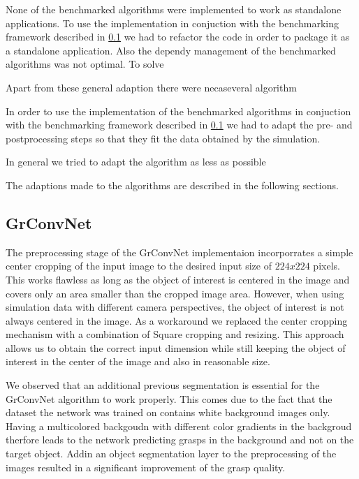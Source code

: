 None of the benchmarked algorithms were implemented to work as standalone applications.
To use the implementation in conjuction with the benchmarking framework described in \ref{} we had to refactor the code in order to package it as a standalone application.
Also the dependy management of the benchmarked algorithms was not optimal.
To solve

Apart from these general adaption there were necaseveral algorithm

In order to use the implementation of the benchmarked algorithms in conjuction with the benchmarking framework described in \ref{} we had to adapt
the pre- and postprocessing steps so that they fit the data obtained by the simulation.

In general we tried to adapt the algorithm as less as possible

The adaptions made to the algorithms are described in the following sections.


\subsection{GrConvNet}
The preprocessing stage of the GrConvNet implementaion incorporrates a simple center cropping of the input image to the desired input size of $224x224$ pixels.
This works flawless as long as the object of interest is centered in the image and covers only an area smaller than the cropped image area.
However, when using simulation data with different camera perspectives, the object of interest is not always centered in the image.
As a workaround we replaced the center cropping mechanism with a combination of Square cropping and resizing.
This approach allows us to obtain the correct input dimension while still keeping the object of interest in the center of the image and also in reasonable size.

We observed that an additional previous segmentation is essential for the GrConvNet algorithm to work properly.
This comes due to the fact that the dataset the network was trained on contains white background images only.
Having a multicolored backgoudn with different color gradients in the backgroud therfore leads to the network predicting grasps in the background and not on the target object.
Addin an object segmentation layer to the preprocessing of the images resulted in a significant improvement of the grasp quality.

